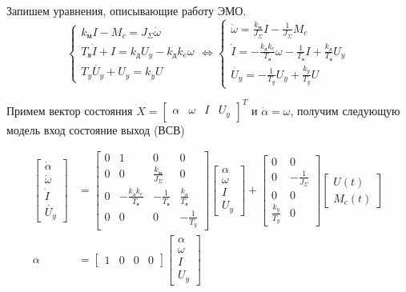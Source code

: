 \documentclass[a4paper, 12pt]{article}
\begin{document}
Запишем уравнения, описывающие работу ЭМО. 
\begin{equation}
\begin{cases}
k_\text{м}I - M_c = J_\Sigma \dot{\omega} \\
T_\text{я}\dot{I} + I = k_\text{д}U_y - k_\text{д}k_e\omega \\
T_y\dot{U_y} + U_y = k_yU
\end{cases} \Leftrightarrow
\begin{cases}
\dot{\omega} = \frac{k_\text{м}}{J_\Sigma}I - \frac{1}{J_\Sigma}M_c \\
\dot{I} = - \frac{k_\text{д}k_e}{T_\text{я}}\omega - \frac{1}{T_\text{я}}I + \frac{k_\text{д}}{T_\text{я}}U_y \\
\dot{U_y} = -\frac{1}{T_y}U_y + \frac{k_y}{T_y}U
\end{cases}
\end{equation} \par
Примем вектор состояния $X = \begin{bmatrix} \alpha & \omega & I & U_y \end{bmatrix}^T$ и $\dot{\alpha} = \omega$, получим следующую модель вход состояние выход (ВСВ)

	\begin{align}
		\begin{bmatrix}
			\dot{\alpha} \\
			\dot{\omega} \\
			\dot{I} \\
			\dot{U_y} 
		\end{bmatrix} & = 
		\begin{bmatrix}
			0 & 1 & 0 & 0 \\
			0 & 0 & \frac{k_\text{м}}{J_\Sigma} & 0 \\
			0 & -\frac{k_\text{д}k_e}{T_\text{я}} & - \frac{1}{T_\text{я}} & \frac{k_\text{д}}{T_\text{я}} \\
			0 & 0 & 0 & -\frac{1}{T_y}
		\end{bmatrix}
		\begin{bmatrix}
			\alpha \\
			\omega \\
			I \\
			U_y 
		\end{bmatrix} + 
		\begin{bmatrix}
			0 & 0 \\
			0 & - \frac{1}{J_\Sigma} \\
			0 & 0 \\
			\frac{k_y}{T_y} & 0
		\end{bmatrix}
		\begin{bmatrix}
			U(t) \\
			M_c(t)
		\end{bmatrix} \\
		\alpha & = 
		\begin{bmatrix}
			1 & 0 & 0 & 0
		\end{bmatrix}
		\begin{bmatrix}
			\alpha \\
			\omega \\
			I \\
			U_y 
		\end{bmatrix}
	\end{align}
	
\end{document}
